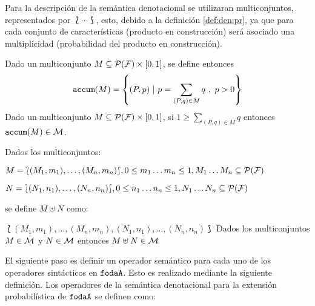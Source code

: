 Para la descripción de la semántica denotacional se
utilizaran multiconjuntos, representados por $\lbag \cdots\rbag$, esto, debido a la definición \ref{def:den:pr}, ya que para cada conjunto de características (producto en construcción) 
será asociado una multiplicidad (probabilidad del producto en construcción).

\bdfn
  Dado un multiconjunto $M \subseteq {\cal P}({\cal F})\times [0,1]$, se define entonces
  $$\mathtt{accum}(M) = \left\{(P,p)\ | \ p=\sum_{(P,q)\in M}q\ ,\ p>0\right\}$$
\edfn
\bprop\label{prop:pr:accum}
 Dado un multiconjunto $M\subseteq {\cal P}({\cal F})\times [0,1]$, si $1\geq\sum_{(P,q)\in M} q$
 entonces $\mathtt{accum}(M)\in{\cal M}$.
\eprop


\bdfn\label{def:pr:sum}
Dados los multiconjuntos:

$M = \lbag (M_{1},m_{1}),\ldots,(M_{n},m_{n})\rbag, 0 \leq m_{1}\ldots m_{n} \leq 1, M_{1}\ldots M_{n} \subseteq {\cal P}({\cal F}) $

$N = \lbag (N_{1},n_{1}),\ldots,(N_{n},n_{n})\rbag, 0 \leq n_{1}\ldots n_{n} \leq 1, N_{1}\ldots N_{n} \subseteq {\cal P}({\cal F}) $
 
se define $M \uplus N$ como:

$\lbag (M_{1},m_{1}),\ldots,(M_{n},m_{n}),(N_{1},n_{1}),\ldots,(N_{n},n_{n})\rbag$
\edfn
\bprop\label{prop:pr:sum}
Dados los multiconjuntos $M\in{\cal M}$ y $N\in{\cal M}$ entonces $M \uplus N \in{\cal M}$
\eprop



El siguiente paso es definir un operador semántico para cada uno de los
operadores sintácticos en $\mathtt{fodaA}$.
Esto es realizado mediante la siguiente definición.
\bdfn\label{def:semantic:operators}
Los operadores de la semántica 
denotacional para la extensión probabilística de $\mathtt{fodaA}$
se definen como:

